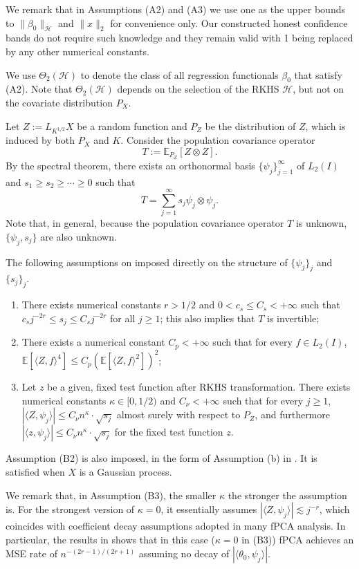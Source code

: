 \documentclass[aos]{imsart}
\newcommand{\mH}{\mathcal H}
\theoremstyle{plain}
\theoremstyle{definition}
\theoremstyle{definition}
\begin{document}
We remark that in Assumptions (A2) and (A3) we use one as the upper bounds to $\|\beta_0\|_\mH$ and $\|x\|_2$ for convenience only. Our constructed honest confidence bands do not require such knowledge
and they remain valid with 1 being replaced by any other numerical constants.

We use $\Theta_2(\mH)$ to denote the class of all regression functionals $\beta_0$ that satisfy (A2). Note that $\Theta_2(\mH)$ depends on the selection of the RKHS $\mH$, but not on the covariate distribution $P_X$.

Let $Z:=L_{K^{1/2}}X$ be a random function and $P_Z$ be the distribution of $Z$, which is induced by both $P_X$ and $K$. Consider the population covariance operator
$$
T := \mathbb E_{P_Z}\left[Z\otimes Z\right].
$$
By the spectral theorem, there exists an orthonormal basis $\{\psi_j\}_{j=1}^{\infty}$ of $L_2(I)$ and $s_1\geq s_2\geq\cdots\geq 0$ such that
\begin{equation}
T = \sum_{j=1}^{\infty} s_j\psi_j\otimes\psi_j.
\label{eq:specT}
\end{equation}
Note that, in general, because the population covariance operator $T$ is unknown, $\{\psi_j,s_j\}$ are also unknown.

The following assumptions on imposed directly on the structure of $\{\psi_j\}_j$ and $\{s_j\}_j$.
\begin{enumerate}
\item[(B1)] There exists numerical constants $r>1/2$ and $0<c_s\leq C_s<+\infty$ such that $c_s j^{-2r}\leq s_j\leq C_sj^{-2r}$ for all $j\geq 1$;
this also implies that $T$ is invertible;
\item[(B2)] There exists a numerical constant $C_p<+\infty$ such that for every $f\in L_2(I)$, $\mathbb E[\langle Z,f\rangle^4] \leq C_p(\mathbb E[\langle Z,f\rangle^2])^2$;
\item[(B3)] Let $z$ be a given, fixed test function after RKHS transformation. There exists numerical constants $\kappa\in[0,1/2)$ and $C_\nu<+\infty$ such that for every $j\geq 1$, $|\langle Z,\psi_j\rangle| \leq C_\nu n^{\kappa}\cdot \sqrt{s_j}$ almost surely with respect to $P_Z$,
and furthermore $|\langle z,\psi_j\rangle|\leq C_\nu n^\kappa\cdot \sqrt{s_j}$ for the fixed test function $z$.
\end{enumerate}

Assumption (B2) is also imposed, in the form of Assumption (b) in \citep{yuan2010reproducing}. It is satisfied when $X$ is a Gaussian process.

We remark that, in Assumption (B3), the smaller $\kappa$ the stronger the assumption is. For the strongest version of $\kappa=0$, it essentially assumes $|\langle Z,\psi_j\rangle|\lesssim j^{-r}$,
which coincides with coefficient decay assumptions adopted in many fPCA analysis.
{\color{red}In particular, the results in \cite{cai2006prediction} shows that in this case ($\kappa=0$ in (B3)) fPCA achieves an MSE rate of $n^{-(2r-1)/(2r+1)}$ assuming no decay of $|\langle\theta_0,\psi_j\rangle|$.}
\end{document}
